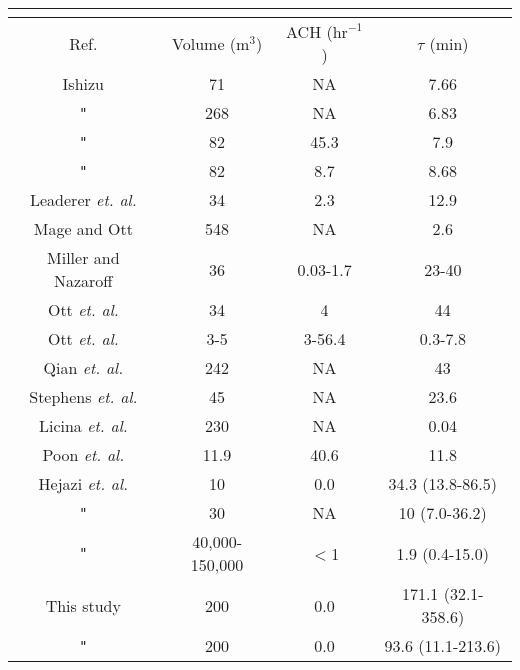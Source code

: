 \documentclass[preprint]{elsarticle}
\newcommand*{\ditto}{\texttt{"}}
\begin{document}
\begin{table}
\fontsize{8}{10}\selectfont
\centering

\begin{tabular}{c c c c}
 \multicolumn{4}{c}{} \\
\hline

Ref. &
Volume ($\text{m}^{3}$) &
ACH ($\text{hr}^{-1}$) &
$\tau$ (min)
\\
\hline

Ishizu\cite{Ishizu1980} & 71 & NA & 7.66\\
\ditto & 268 & NA & 6.83\\
\ditto & 82 & 45.3 & 7.9\\
\ditto & 82 & 8.7 & 8.68\\
 
Leaderer \textit{et. al.}\cite{Leaderer1984} & 34 & 2.3 & 12.9\\

Mage and Ott\cite{Mage1996} & 548 & NA & 2.6\\

Miller and Nazaroff\cite{Miller2001} & 36 & 0.03-1.7 & 23-40\\

Ott \textit{et. al.}\cite{Ott2003house} & 34 & 4 & 44\\

Ott \textit{et. al.}\cite{Ott2008cars} & 3-5 & 3-56.4 & 0.3-7.8\\

Qian \textit{et. al.}\cite{Qian2012} & 242 & NA & 43\\

Stephens \textit{et. al.}\cite{Stephens2013} & 45 & NA & 23.6\\

Licina \textit{et. al.}\cite{Licina2014} & 230 & NA & 0.04\\

Poon \textit{et. al.}\cite{Poon2016} & 11.9 & 40.6 & 11.8\\
 
Hejazi \textit{et. al.}\cite{Hejazi2021} & 10 & 0.0 & 34.3 (13.8-86.5)\\

\ditto & 30 & NA & 10 (7.0-36.2)\\

\ditto & 40,000-150,000 & $<$1 & 1.9 (0.4-15.0)\\

This study & 200 & 0.0 & 171.1 (32.1-358.6)\\

\ditto & 200 & 0.0 & 93.6 (11.1-213.6)\\


\end{tabular}
\end{table}
\end{document}
